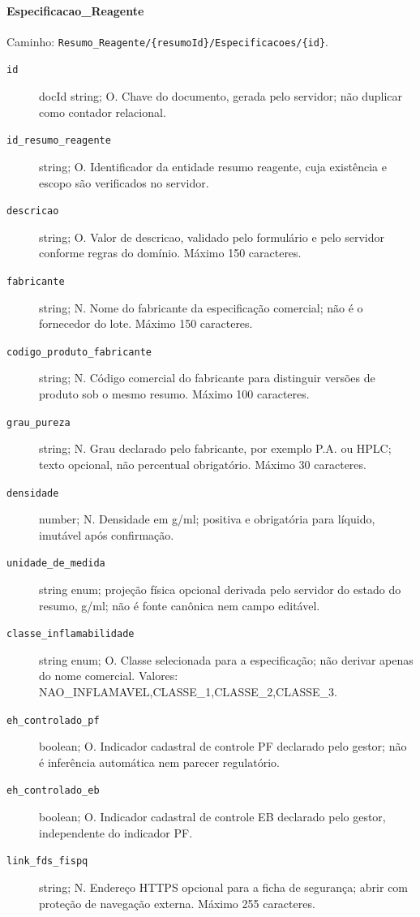 \paragraph{Especificacao\_Reagente}\mbox{}\par
Caminho: \texttt{Resumo\_Reagente/\{resumoId\}/Especificacoes/\{id\}}.
\begin{description}
\item[\texttt{id}] docId string; O. Chave do documento, gerada pelo servidor; não duplicar como contador relacional.
\item[\texttt{id\_resumo\_reagente}] string; O. Identificador da entidade resumo reagente, cuja existência e escopo são verificados no servidor.
\item[\texttt{descricao}] string; O. Valor de descricao, validado pelo formulário e pelo servidor conforme regras do domínio. Máximo 150 caracteres.
\item[\texttt{fabricante}] string; N. Nome do fabricante da especificação comercial; não é o fornecedor do lote. Máximo 150 caracteres.
\item[\texttt{codigo\_produto\_fabricante}] string; N. Código comercial do fabricante para distinguir versões de produto sob o mesmo resumo. Máximo 100 caracteres.
\item[\texttt{grau\_pureza}] string; N. Grau declarado pelo fabricante, por exemplo P.A. ou HPLC; texto opcional, não percentual obrigatório. Máximo 30 caracteres.
\item[\texttt{densidade}] number; N. Densidade em g/ml; positiva e obrigatória para líquido, imutável após confirmação.
\item[\texttt{unidade\_de\_medida}] string enum; projeção física opcional derivada pelo servidor do estado do resumo, g/ml; não é fonte canônica nem campo editável.
\item[\texttt{classe\_inflamabilidade}] string enum; O. Classe selecionada para a especificação; não derivar apenas do nome comercial. Valores: NAO\_INFLAMAVEL,CLASSE\_1,CLASSE\_2,CLASSE\_3.
\item[\texttt{eh\_controlado\_pf}] boolean; O. Indicador cadastral de controle PF declarado pelo gestor; não é inferência automática nem parecer regulatório.
\item[\texttt{eh\_controlado\_eb}] boolean; O. Indicador cadastral de controle EB declarado pelo gestor, independente do indicador PF.
\item[\texttt{link\_fds\_fispq}] string; N. Endereço HTTPS opcional para a ficha de segurança; abrir com proteção de navegação externa. Máximo 255 caracteres.
\end{description}

